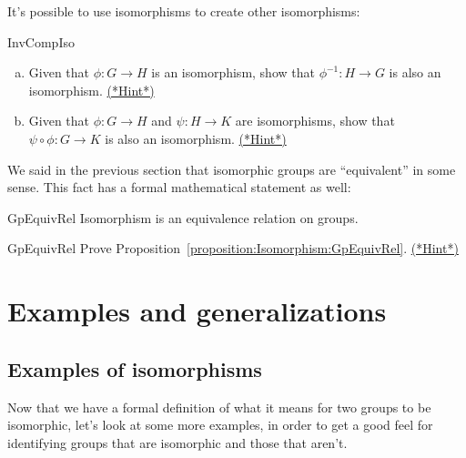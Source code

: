 It's possible to use isomorphisms to create other isomorphisms:

\begin{exercise}{InvCompIso}
\begin{enumerate}[(a)]
\item
Given that  $\phi : G \rightarrow H$ is an  isomorphism, show that  $\phi^{-1} : H \rightarrow G$ is also an  isomorphism.
\hyperref[sec:Isomorphism:hints]{(*Hint*)}
\item
Given that  $\phi : G \rightarrow H$ and $\psi : H \rightarrow K$ are  isomorphisms, show that  $\psi \circ\phi:G \rightarrow K$ is also an  isomorphism.
\hyperref[sec:Isomorphism:hints]{(*Hint*)}
\end{enumerate}
\end{exercise}

We said in the previous section that isomorphic groups are ``equivalent'' in some sense. This fact has a formal mathematical statement as well:

\begin{prop}{GpEquivRel}
Isomorphism is an equivalence relation on groups. 
\end{prop}

\begin{exercise}{GpEquivRel}
Prove Proposition~\ref{proposition:Isomorphism:GpEquivRel}.
\hyperref[sec:Isomorphism:hints]{(*Hint*)}
\end{exercise}

\section{Examples and generalizations}
\label{sec:Isomorphism:ExampleAndGeneralization}

\subsection{Examples of isomorphisms}
Now that we have a formal definition of what it means for two groups to be isomorphic, let's look at some more examples, in order to get a good feel for identifying groups that are isomorphic and those that aren't.

